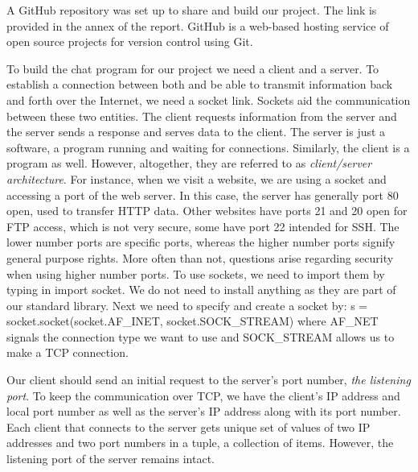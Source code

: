 A GitHub repository was set up to share and build our project. The link is provided in the annex of the report. GitHub is a web-based hosting service of open source projects for version control using Git. 

To build the chat program for our project we need a client and a server. To establish a connection between both and be able to transmit information back and forth over the Internet, we need a socket link. Sockets aid the communication between these two entities. The client requests information from the server and the server sends a response and serves data to the client. The server is just a software, a program running and waiting for connections. Similarly, the client is a program as well. However, altogether, they are referred to as \emph{client/server architecture}. For instance, when we visit a website, we are using a socket and accessing a port of the web server. In this case, the server has generally port 80 open, used to transfer HTTP data. Other websites have ports 21 and 20 open for FTP access, which is not very secure, some have port 22 intended for SSH. The lower number ports are specific ports, whereas the higher number ports signify general purpose rights. More often than not, questions arise regarding security when using higher number ports. To use sockets, we need to import them by typing in import socket. We do not need to install anything as they are part of our standard library. Next we need to specify and create a socket by: s = socket.socket(socket.AF_INET, socket.SOCK_STREAM) where AF_NET signals the connection type we want to use and SOCK_STREAM allows us to make a TCP connection. 

Our client should send an initial request to the server's port number, \emph{the listening port}. To keep the communication over TCP, we have the client's IP address and local port number as well as the server's IP address along with its port number. Each client that connects to the server gets unique set of values of two IP addresses and two port numbers in a tuple, a collection of items. However, the listening port of the server remains intact. 